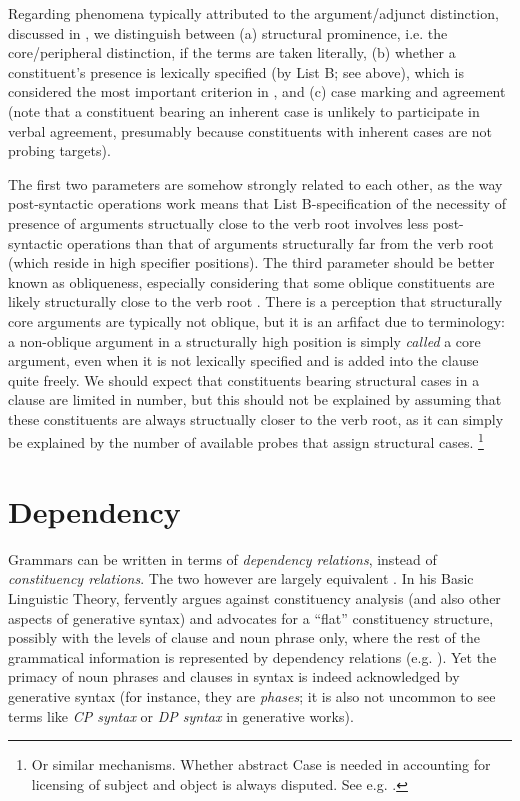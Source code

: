 \documentclass[UTF8, a4paper, oneside, scheme=plain, 12pt]{ctexrep}
\newcommand*{\citepage}[1]{p.~{#1}}
\newcommand*{\term}[1]{\emph{#1}}
\begin{document}
{Regarding phenomena typically attributed to the argument/adjunct distinction,
discussed in , we distinguish between 
(a) structural prominence, i.e. the core/peripheral distinction, if the terms are taken literally, 
(b) whether a constituent's presence is lexically specified (by List B; see above), which is considered the most important criterion in \citet[\citepage{219}]{cgel},
and (c) case marking and agreement (note that a constituent bearing an inherent case is unlikely to participate in verbal agreement, presumably because constituents with inherent cases are not probing targets).

The first two parameters are somehow strongly related to each other,
as the way post-syntactic operations work means that List B-specification of the necessity of presence of arguments structually close to the verb root involves less post-syntactic operations than that of arguments structurally far from the verb root (which reside in high specifier positions).
The third parameter should be better known as obliqueness, especially considering that some oblique constituents are likely structurally close to the verb root \citep[\citepage{404}]{meiguang2018}.
There is a perception that structurally core arguments are typically not oblique,
but it is an arfifact due to terminology:
a non-oblique argument in a structurally high position is simply \emph{called} a core argument,
even when it is not lexically specified and is added into the clause quite freely.
We should expect that constituents bearing structural cases in a clause are limited in number,
but this should not be explained by assuming that these constituents are always structually closer to the verb root, as it can simply be explained by the number of available probes that assign structural cases.%
\footnote{
    Or similar mechanisms. Whether abstract Case is needed in accounting for licensing of subject and object is always disputed. See e.g. \citet{sheehan2016we}. 
}

\section{Dependency}\label{sec:theory.dependency}

Grammars can be written in terms of \emph{dependency relations}, instead of \emph{constituency relations}.
The two however are largely equivalent \citep{boston2009dependency}.
In his Basic Linguistic Theory, \citet{dixon2009basic} fervently argues against constituency analysis (and also other aspects of generative syntax) and advocates for a ``flat'' constituency structure, possibly with the levels of clause and noun phrase only,
where the rest of the grammatical information is represented by dependency relations 
(e.g. \citealt[\citepage{49}]{dixon2009basic}).
Yet the primacy of noun phrases and clauses in syntax is indeed acknowledged by generative syntax (for instance, they are \term{phases}; it is also not uncommon to see terms like \term{CP syntax} or \term{DP syntax} in generative works).

}
\end{document}
